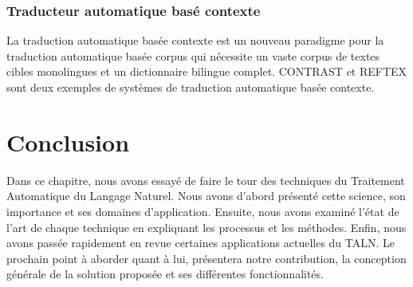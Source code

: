         \subsubsection{Traducteur automatique basé contexte}
        La traduction automatique basée contexte est un nouveau paradigme pour la traduction automatique basée corpus qui nécessite un vaste corpus de textes cibles monolingues et un dictionnaire bilingue complet. CONTRAST \cite{8} et REFTEX \cite{9} sont deux exemples de systèmes de traduction automatique basée contexte.


\section{Conclusion}
Dans ce chapitre, nous avons essayé de faire le tour des techniques du Traitement Automatique du Langage Naturel. Nous avons d'abord présenté cette science, son importance et ses domaines d'application. Ensuite, nous avons examiné l'état de l'art de chaque technique en expliquant les processus et les méthodes. Enfin, nous avons passée rapidement en revue certaines applications actuelles du TALN.
Le prochain point à aborder quant à lui, présentera notre contribution, la conception générale de la solution proposée et ses différentes fonctionnalités.  